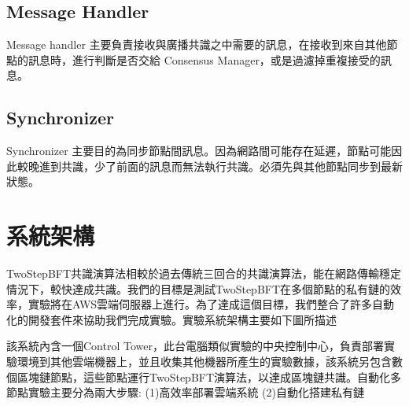 \subsection{Message Handler}\label{se_5} 
Message handler 主要負責接收與廣播共識之中需要的訊息，在接收到來自其他節點的訊息時，進行判斷是否交給 Consensus Manager，或是過濾掉重複接受的訊息。

\subsection{Synchronizer}\label{se_5}
Synchronizer 主要目的為同步節點間訊息。因為網路間可能存在延遲，節點可能因此較晚進到共識，少了前面的訊息而無法執行共識。必須先與其他節點同步到最新狀態。  




\section{系統架構}\label{se_5}  
TwoStepBFT共識演算法相較於過去傳統三回合的共識演算法，能在網路傳輸穩定情況下，較快達成共識。我們的目標是測試TwoStepBFT在多個節點的私有鏈的效率，實驗將在AWS雲端伺服器上進行。為了達成這個目標，我們整合了許多自動化的開發套件來協助我們完成實驗。實驗系統架構主要如下圖所描述 



該系統內含一個Control Tower，此台電腦類似實驗的中央控制中心，負責部署實驗環境到其他雲端機器上，並且收集其他機器所產生的實驗數據，該系統另包含數個區塊鏈節點，這些節點運行TwoStepBFT演算法，以達成區塊鏈共識。自動化多節點實驗主要分為兩大步驟: (1)高效率部署雲端系統 (2)自動化搭建私有鏈

